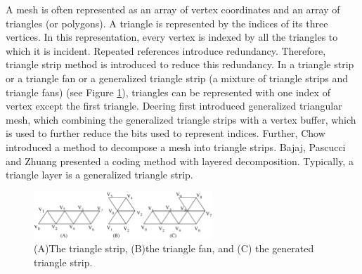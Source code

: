 \documentclass[11pt, a4paper]{report}
\begin{document}
    A mesh is often represented as an array of vertex coordinates and 
    an array of triangles (or polygons). A triangle is represented by 
    the indices of its three vertices.
    In this representation, every vertex is indexed by all the
    triangles to which it is incident. Repeated references introduce
    redundancy. Therefore, triangle strip method is introduced to
    reduce this redundancy. In a triangle strip or a triangle fan or a
    generalized triangle strip (a mixture of triangle strips and
    triangle fans) (see Figure \ref{strip}), 
    triangles can be represented with one index of vertex
    except the first triangle. 
    Deering \cite{218391} first introduced generalized triangular mesh, 
    which combining the generalized triangle strips with a vertex buffer,
    which is used to further reduce the bits used to represent indices. 
    Further, Chow \cite{267103} introduced a method to
    decompose a mesh into triangle strips. 
    Bajaj, Pascucci and Zhuang \cite{789628} presented a coding method with layered
    decomposition. 
    Typically, a triangle layer is a generalized triangle strip. 
    \begin{figure}[ht]
    \centering
    \includegraphics[width=0.6\textwidth]{strip.eps}
    \caption{(A)The triangle strip, (B)the triangle fan, and (C) the generated triangle strip.}\label{strip}
    \end{figure}
\end{document}
